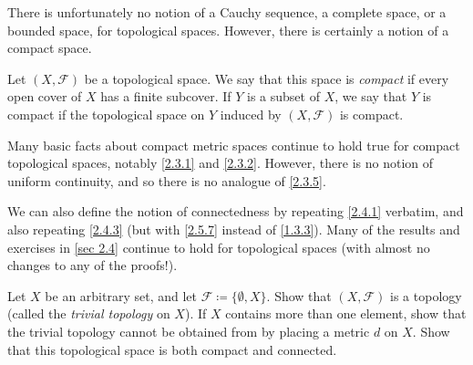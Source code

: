 \begin{note}
  There is unfortunately no notion of a Cauchy sequence, a complete space, or a bounded space, for topological spaces.
  However, there is certainly a notion of a compact space.
\end{note}

\begin{definition}\label{2.5.9}
  Let \((X, \mathcal{F})\) be a topological space.
  We say that this space is \emph{compact} if every open cover of \(X\) has a finite subcover.
  If \(Y\) is a subset of \(X\), we say that \(Y\) is compact if the topological space on \(Y\) induced by \((X, \mathcal{F})\) is compact.
\end{definition}

\begin{note}
  Many basic facts about compact metric spaces continue to hold true for compact topological spaces, notably \cref{2.3.1} and \cref{2.3.2}.
  However, there is no notion of uniform continuity, and so there is no analogue of \cref{2.3.5}.
\end{note}

\begin{note}
  We can also define the notion of connectedness by repeating \cref{2.4.1} verbatim, and also repeating \cref{2.4.3} (but with \cref{2.5.7} instead of \cref{1.3.3}).
  Many of the results and exercises in \cref{sec 2.4} continue to hold for topological spaces
  (with almost no changes to any of the proofs!).
\end{note}

\exercisesection

\begin{exercise}\label{ex 2.5.1}
  Let \(X\) be an arbitrary set, and let \(\mathcal{F} \coloneqq \{\emptyset, X\}\).
  Show that \((X, \mathcal{F})\) is a topology
  (called the \emph{trivial topology} on \(X\)).
  If \(X\) contains more than one element, show that the trivial topology cannot be obtained from by placing a metric \(d\) on \(X\).
  Show that this topological space is both compact and connected.
\end{exercise}

